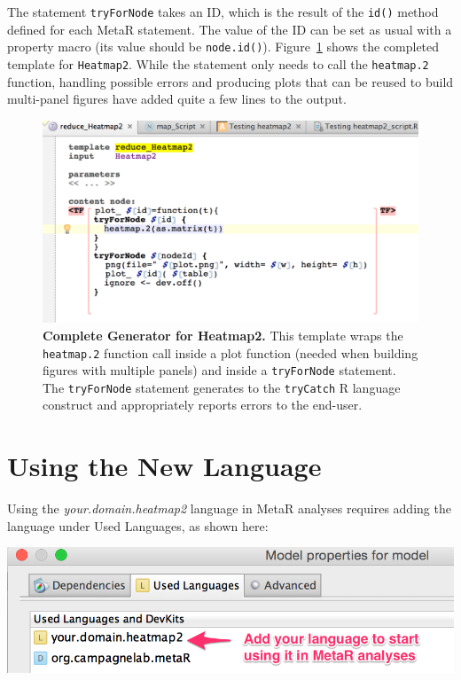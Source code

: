 The statement \texttt{tryForNode} takes an ID, which is the result of the \texttt{id()} method defined for each MetaR statement. The value of the ID can be set as usual with a property macro (its value should be \texttt{node.id()}). Figure~\ref{fig:Heatmap2GeneratorComplete} shows the completed template for \texttt{Heatmap2}. While the statement only needs to call the \texttt{heatmap.2} function, handling possible errors and producing plots that can be reused to build multi-panel figures have added quite a few lines to the output.

\begin{figure}[h!tbp]
  \centering
  \includegraphics[width=\figWidthWide]{figures/Heatmap2GeneratorComplete.png}
\caption[Complete Generator for Heatmap2.]{\textbf{Complete Generator for Heatmap2.} This template wraps the \texttt{heatmap.2} function call inside a plot function (needed when building figures with multiple panels) and inside a \texttt{tryForNode} statement. The \texttt{tryForNode} statement generates to the \texttt{tryCatch} R language construct and appropriately reports errors to the end-user.}
\label{fig:Heatmap2GeneratorComplete}
\end{figure}
 
\section{Using the New Language}
Using the \textit{your.domain.heatmap2} language in MetaR analyses  requires adding the language under Used Languages, as shown here:

  \includegraphics[width=\figWidthNarrow]{figures/LanguageExtensionUsedLanguages.png}


